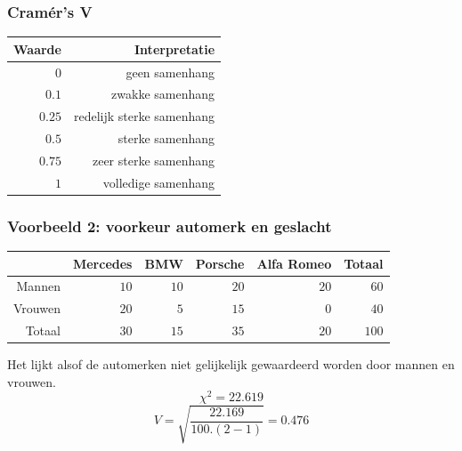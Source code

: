 \documentclass{beamer}
\begin{document}
\begin{frame}
  \frametitle{Cramér's V}
  \begin{table}[h] \centering
    \begin{tabular}{@{}rr@{}} \toprule
      Waarde & Interpretatie \\
      \midrule
      $0$ & geen samenhang \\
      $0.1$ &  zwakke samenhang \\
      $0.25$ & redelijk sterke samenhang \\
      $0.5$ & sterke samenhang \\
      $0.75$ & zeer sterke samenhang \\
      $1$ & volledige samenhang \\
      \bottomrule
    \end{tabular}
  \end{table}
\end{frame}

\begin{frame}
  \frametitle{Voorbeeld 2: voorkeur automerk en geslacht}
  \begin{table}[h] \centering
    \begin{tabular}{@{}rrrrrr@{}} \toprule
      & Mercedes & BMW & Porsche& Alfa Romeo & Totaal \\
      \midrule
      Mannen  & $10$ & $10$ & $20$ & $20$ & $60$ \\
      Vrouwen & $20$ & $5$  & $15$ & $0$  & $40$ \\
      Totaal  & $30$ & $15$ & $35$ & $20$ & $100$ \\
      \bottomrule
    \end{tabular}
  \end{table}
  Het lijkt alsof de automerken niet gelijkelijk gewaardeerd worden door mannen en vrouwen.
  \[ \chi^{2} = 22.619 \]
  \[ V = \sqrt{\frac{22.169}{100 . (2-1)}}  = 0.476\]
\end{frame}
\end{document}
